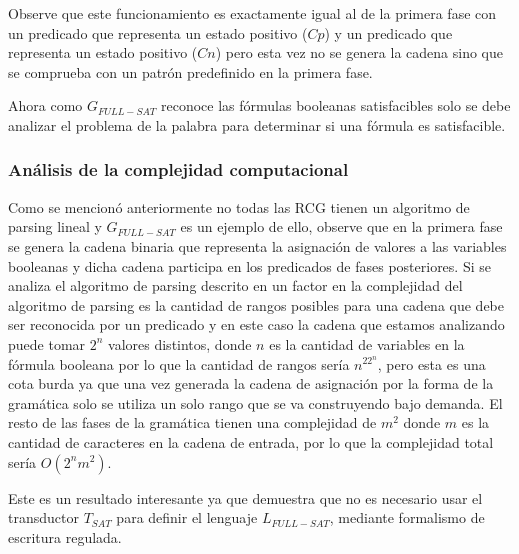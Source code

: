 \documentclass{article}
\begin{document}
\begin{itemize}
          Observe que este funcionamiento es exactamente igual al de la primera fase con un predicado que representa un estado
          positivo ($Cp$) y un predicado que representa un estado
          positivo ($Cn$) pero esta vez no se genera la cadena sino que se comprueba con un patrón predefinido en la primera
          fase.
          
          Ahora como $G_{FULL-SAT}$ reconoce las fórmulas booleanas satisfacibles solo se debe analizar el problema de la
          palabra para determinar si una fórmula es satisfacible.
          
          \subsubsection{Análisis de la complejidad computacional}
          
          Como se mencionó anteriormente no todas las RCG tienen un algoritmo de parsing lineal y $G_{FULL-SAT}$ es un ejemplo de 
          ello, observe que en la primera fase se genera la cadena binaria que representa la asignación de valores a las variables
          booleanas y dicha cadena participa en los predicados de fases posteriores. Si se analiza el algoritmo de parsing descrito en 
          \cite{mainRCGBib} un factor en la complejidad del algoritmo de parsing es la cantidad de rangos posibles para una cadena 
          que debe ser reconocida por un predicado y en este caso la cadena que estamos analizando puede tomar $2^n$ valores distintos, donde
          $n$ es la cantidad de variables en la fórmula booleana por lo que la cantidad de rangos sería $n^22^n$, pero esta es una cota
          burda ya que una vez generada la cadena de asignación por la forma de la gramática solo se utiliza un solo rango que se va construyendo
          bajo demanda. El resto de las fases de la gramática tienen una complejidad de $m^2$ donde $m$ es la cantidad de caracteres
          en la cadena de entrada, por lo que la complejidad total sería $O(2^nm^2)$.
          
          Este es un resultado interesante ya que demuestra que no es necesario usar el transductor $T_{SAT}$ para definir el 
          lenguaje $L_{FULL-SAT}$, mediante formalismo de escritura regulada.
          
          
\end{itemize}
\end{document}
